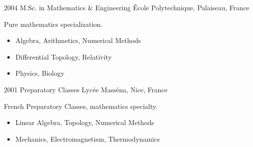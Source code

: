 \documentclass[12pt]{friggeri-cv}
\begin{document}
\begin{entrylist}
  \entry
    {2004}
    {M.Sc. in Mathematics \& Engineering}
    {\'{E}cole Polytechnique, Palaiseau, France}
    {Pure mathematics specialization.
    \begin{itemize}
        \item Algebra, Arithmetics, Numerical Methods
        \item Differential Topology, Relativity
        \item Physics, Biology
    \end{itemize}
    }

  \entry
    {2001}
    {Preparatory Classes}
    {Lyc\'{e}e Mass\'{e}na, Nice, France}
    {French Preparatory Classes, mathematics specialty.
    \begin{itemize}
        \item Linear Algebra, Topology, Numerical Methods
        \item Mechanics, Electromagnetism, Thermodynamics
    \end{itemize}
    }


\end{entrylist}

\newpage
\end{document}
